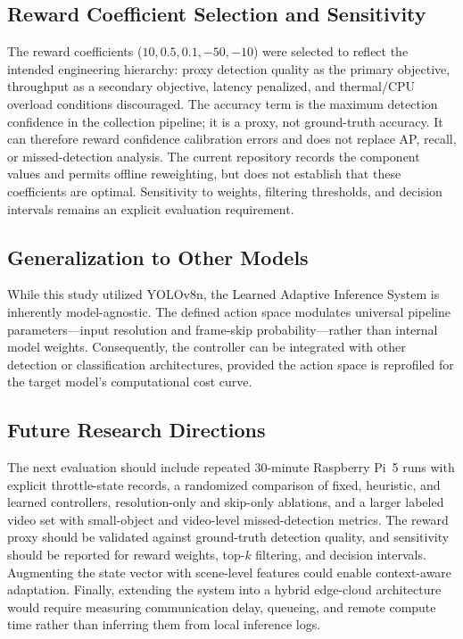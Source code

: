 \documentclass{ieeeaccess}
\begin{document}
\subsection{Reward Coefficient Selection and Sensitivity}

The reward coefficients ($10, 0.5, 0.1, -50, -10$) were selected to
reflect the intended engineering hierarchy: proxy detection quality as the
primary objective, throughput as a secondary objective, latency penalized,
and thermal/CPU overload conditions discouraged. The accuracy term is the
maximum detection confidence in the collection pipeline; it is a proxy, not
ground-truth accuracy. It can therefore reward confidence calibration errors
and does not replace AP, recall, or missed-detection analysis. The current
repository records the component values and permits offline reweighting, but
does not establish that these coefficients are optimal. Sensitivity to
weights, filtering thresholds, and decision intervals remains an explicit
evaluation requirement.

\subsection{Generalization to Other Models}
While this study utilized YOLOv8n, the Learned Adaptive Inference System is inherently model-agnostic. The defined action space modulates universal pipeline parameters---input resolution and frame-skip probability---rather than internal model weights. Consequently, the controller can be integrated with other detection or classification architectures, provided the action space is reprofiled for the target model's computational cost curve.

\subsection{Future Research Directions}
The next evaluation should include repeated 30-minute Raspberry Pi~5 runs
with explicit throttle-state records, a randomized comparison of fixed,
heuristic, and learned controllers, resolution-only and skip-only ablations,
and a larger labeled video set with small-object and video-level
missed-detection metrics. The reward proxy should be validated against
ground-truth detection quality, and sensitivity should be reported for
reward weights, top-$k$ filtering, and decision intervals. Augmenting the
state vector with scene-level features could enable context-aware
adaptation. Finally, extending the system into a hybrid edge-cloud
architecture would require measuring communication delay, queueing, and
remote compute time rather than inferring them from local inference logs.
\end{document}
